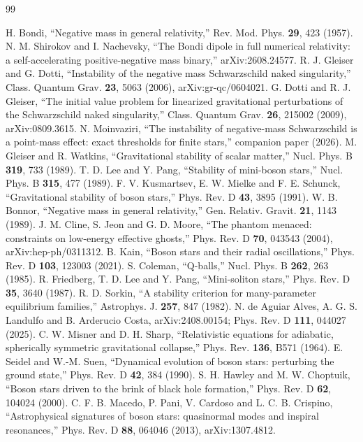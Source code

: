 \documentclass[11pt]{article}
\theoremstyle{remark}
\begin{document}
\begin{thebibliography}{99}

 H. Bondi, ``Negative mass in general relativity,'' Rev. Mod. Phys. \textbf{29}, 423 (1957).
 N. M. Shirokov and I. Nachevsky, ``The Bondi dipole in full numerical relativity: a
self-accelerating positive-negative mass binary,'' arXiv:2608.24577.
 R. J. Gleiser and G. Dotti, ``Instability of the negative mass Schwarzschild naked singularity,''
Class. Quantum Grav. \textbf{23}, 5063 (2006), arXiv:gr-qc/0604021.
 G. Dotti and R. J. Gleiser, ``The initial value problem for linearized gravitational perturbations of
the Schwarzschild naked singularity,'' Class. Quantum Grav. \textbf{26}, 215002 (2009), arXiv:0809.3615.
 N. Moinvaziri, ``The instability of negative-mass Schwarzschild is a point-mass effect: exact thresholds for finite stars,'' companion paper (2026).
 M. Gleiser and R. Watkins, ``Gravitational stability of scalar matter,'' Nucl. Phys. B \textbf{319},
733 (1989).
 T. D. Lee and Y. Pang, ``Stability of mini-boson stars,'' Nucl. Phys. B \textbf{315}, 477 (1989).
 F. V. Kusmartsev, E. W. Mielke and F. E. Schunck, ``Gravitational stability of boson stars,'' Phys.
Rev. D \textbf{43}, 3895 (1991).
 W. B. Bonnor, ``Negative mass in general relativity,'' Gen. Relativ. Gravit. \textbf{21}, 1143 (1989).
 J. M. Cline, S. Jeon and G. D. Moore, ``The phantom menaced: constraints on low-energy effective
ghosts,'' Phys. Rev. D \textbf{70}, 043543 (2004), arXiv:hep-ph/0311312.
 B. Kain, ``Boson stars and their radial oscillations,'' Phys. Rev. D
\textbf{103}, 123003 (2021).
 S. Coleman, ``Q-balls,'' Nucl. Phys. B \textbf{262}, 263 (1985).
 R. Friedberg, T. D. Lee and Y. Pang, ``Mini-soliton stars,'' Phys. Rev. D \textbf{35}, 3640 (1987).
 R. D. Sorkin, ``A stability criterion for many-parameter equilibrium families,'' Astrophys. J.
\textbf{257}, 847 (1982).
 N. de Aguiar Alves, A. G. S. Landulfo and B. Arderucio Costa, arXiv:2408.00154; Phys. Rev. D
\textbf{111}, 044027 (2025).
 C. W. Misner and D. H. Sharp, ``Relativistic equations for adiabatic, spherically symmetric
gravitational collapse,'' Phys. Rev. \textbf{136}, B571 (1964).
 E. Seidel and W.-M. Suen, ``Dynamical evolution of boson stars: perturbing the ground state,''
Phys. Rev. D \textbf{42}, 384 (1990).
 S. H. Hawley and M. W. Choptuik, ``Boson stars driven to the brink of black hole
formation,'' Phys. Rev. D \textbf{62}, 104024 (2000).
 C. F. B. Macedo, P. Pani, V. Cardoso and L. C. B. Crispino, ``Astrophysical signatures of boson
stars: quasinormal modes and inspiral resonances,'' Phys. Rev. D \textbf{88}, 064046 (2013), arXiv:1307.4812.

\end{thebibliography}
\end{document}
